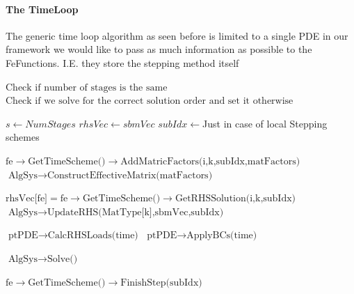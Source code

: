 \paragraph{The TimeLoop}
The generic time loop algorithm as seen before is limited to a single PDE in our framework we would
like to pass as much information as possible to the FeFunctions. I.E. they store the stepping method
itself
\begin{algorithm}
\caption{GLM loop coupled PDE} \label{alg:genLoopCoupledFeFunction}
\begin{algorithmic}
\STATE {}
\STATE $\text{Check if number of stages is the same}$
\STATE $\text{Check if we solve for the correct solution order and set it otherwise}$

\STATE $s \gets NumStages$
\STATE $rhsVec \gets sbmVec$
\STATE $subIdx \gets $Just in case of local Stepping schemes

\STATE {}
    \STATE $\text{fe}\rightarrow \text{GetTimeScheme()}\rightarrow \text{AddMatricFactors(i,k,subIdx,matFactors)}$
  \ENDFOR
  \STATE $\text{AlgSys}\rightarrow \text{ConstructEffectiveMatrix(matFactors)}$
\ENDFOR

\STATE {}
    \STATE $\text{rhsVec[fe]} = \text{fe}\rightarrow \text{GetTimeScheme()}\rightarrow \text{GetRHSSolution(i,k,subIdx)}$
  \ENDFOR
  \STATE $\text{AlgSys}\rightarrow \text{UpdateRHS(MatType[k],sbmVec,subIdx)}$
\ENDFOR

\STATE $\text{ptPDE}\rightarrow \text{CalcRHSLoads(time)}$
\STATE $\text{ptPDE}\rightarrow \text{ApplyBCs(time)}$

\STATE $\text{AlgSys}\rightarrow \text{Solve()}$

\ENDFOR
\STATE {}
  \STATE $\text{fe}\rightarrow \text{GetTimeScheme()}\rightarrow \text{FinishStep(subIdx)}$
\ENDFOR
\end{algorithmic}
\end{algorithm}

